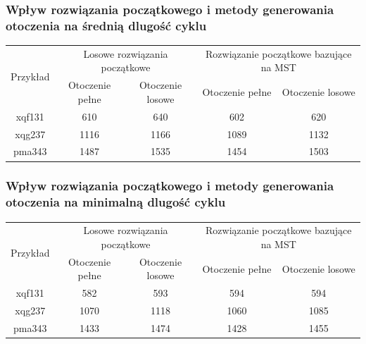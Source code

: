 \documentclass{article}
\begin{document}
\subsubsection{Wpływ rozwiązania początkowego i metody generowania otoczenia na średnią dlugość cyklu}
\begin{table}[h!]
    \centering
    \begin{tabular}{|c|c|c|c|c|}
        \hline 
        \multirow{2}{*}{Przykład} & \multicolumn{2}{|c|}{Losowe rozwiązania początkowe} & \multicolumn{2}{|c|}{Rozwiązanie początkowe bazujące na MST} \\
        \cline{2-5}
        \cline{2-5} & Otoczenie pełne & Otoczenie losowe & Otoczenie pełne & Otoczenie losowe \\
        \hline
        xqf131 & 610 & 640 & 602 & 620 \\
        \hline
        xqg237 & 1116 & 1166 & 1089 & 1132 \\
        \hline
        pma343 & 1487 & 1535 & 1454 & 1503 \\
        \hline
    \end{tabular}
\end{table}

\subsubsection{Wpływ rozwiązania początkowego i metody generowania otoczenia na minimalną dlugość cyklu}
\begin{table}[h!]
    \centering
    \begin{tabular}{|c|c|c|c|c|}
        \hline 
        \multirow{2}{*}{Przykład} & \multicolumn{2}{|c|}{Losowe rozwiązania początkowe} & \multicolumn{2}{|c|}{Rozwiązanie początkowe bazujące na MST} \\
        \cline{2-5}
        \cline{2-5} & Otoczenie pełne & Otoczenie losowe & Otoczenie pełne & Otoczenie losowe \\
        \hline
        xqf131 & 582 & 593 & 594 & 594 \\
        \hline
        xqg237 & 1070 & 1118 & 1060 & 1085 \\
        \hline
        pma343 & 1433 & 1474 & 1428 & 1455 \\
        \hline
    \end{tabular}
\end{table}
\end{document}
